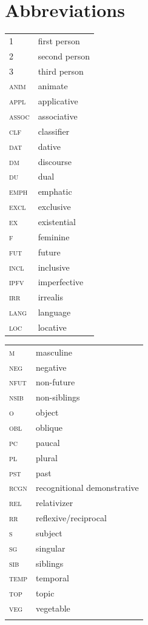 \documentclass[output=paper,colorlinks,citecolor=brown]{langscibook}
\begin{document}
\section*{Abbreviations}
\begin{tabularx}{.45\textwidth}{lQ}
1 & first person \\
2 & second person \\
3 & third person \\
\scshape anim & animate \\ 
\scshape appl & applicative \\
\scshape assoc & associative\\
\scshape clf & classifier\\
\scshape dat & dative \\
\scshape dm & discourse \\
\scshape du & dual\\
\scshape emph & emphatic \\
\scshape excl & exclusive\\
\scshape ex& existential \\
\scshape f & feminine \\
\scshape fut & future\\
\scshape incl & inclusive\\
\scshape ipfv & imperfective\\
\scshape irr & irrealis\\
\scshape lang & language \\
\scshape loc & locative\\
\end{tabularx}
\begin{tabularx}{.45\textwidth}{lQ}
\scshape m & masculine \\
\scshape neg & negative\\
\scshape nfut & non-future\\
\scshape nsib & non-siblings\\
\scshape o & object\\
\scshape obl & oblique\\
\scshape pc & paucal \\
\scshape pl & plural\\
\scshape pst & past\\
\scshape rcgn & recognitional demonstrative\\
\scshape rel & relativizer\\
\scshape rr & reflexive/reciprocal \\ 
\scshape s & subject\\
\scshape sg & singular\\
\scshape sib & siblings\\
\scshape temp & temporal \\
\scshape top & topic \\
\scshape veg & vegetable \\
\\
\end{tabularx}
\smallskip
\end{document}
